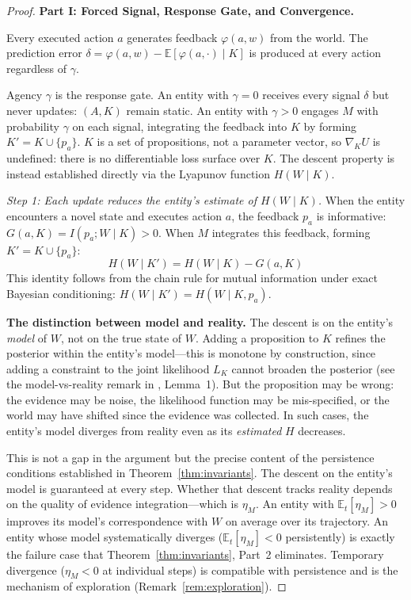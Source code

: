 \documentclass[11pt]{article}
\theoremstyle{definition}
\theoremstyle{remark}
\begin{document}
\begin{proof}
\textbf{Part I: Forced Signal, Response Gate, and Convergence.}

Every executed action $a$ generates feedback $\varphi(a, w)$ from the
world. The prediction error $\delta = \varphi(a, w) -
\mathbb{E}[\varphi(a, \cdot) \mid K]$ is produced at every action
regardless of $\gamma$.

Agency $\gamma$ is the response gate. An entity with $\gamma = 0$ receives
every signal $\delta$ but never updates: $(A, K)$ remain static. An
entity with $\gamma > 0$ engages $M$ with probability $\gamma$ on each
signal, integrating the feedback into $K$ by forming
$K' = K \cup \{p_a\}$. $K$ is a set of propositions, not a parameter
vector, so $\nabla_K U$ is undefined: there is no differentiable loss
surface over $K$. The descent property is instead established directly
via the Lyapunov function $H(W \mid K)$.

\emph{Step 1: Each update reduces the entity's estimate of $H(W \mid K)$.}
When the entity encounters a novel state and executes action $a$, the
feedback $p_a$ is informative: $G(a, K) = I(p_a; W \mid K) > 0$.
When $M$ integrates this feedback, forming $K' = K \cup \{p_a\}$:
\[
H(W \mid K') = H(W \mid K) - G(a, K)
\]
This identity follows from the chain rule for mutual information under
exact Bayesian conditioning: $H(W \mid K') = H(W \mid K, p_a)$.

\textbf{The distinction between model and reality.}
The descent is on the entity's \emph{model} of $W$, not on the true
state of $W$. Adding a proposition to $K$ refines the posterior within
the entity's model---this is monotone by construction, since adding a
constraint to the joint likelihood $L_K$ cannot broaden the posterior
(see the model-vs-reality remark in \cite{McCarthy2026b}, Lemma~1).
But the proposition may be wrong: the evidence may be noise, the
likelihood function may be mis-specified, or the world may have shifted
since the evidence was collected. In such cases, the entity's model
diverges from reality even as its \emph{estimated} $H$ decreases.

This is not a gap in the argument but the precise content of the
persistence conditions established in Theorem~\ref{thm:invariants}.
The descent on the entity's model is guaranteed at every step. Whether
that descent tracks reality depends on the quality of evidence
integration---which is $\eta_M$. An entity with
$\mathbb{E}_t[\eta_M] > 0$ improves its model's correspondence with
$W$ on average over its trajectory. An entity whose model
systematically diverges ($\mathbb{E}_t[\eta_M] < 0$ persistently) is
exactly the failure case that Theorem~\ref{thm:invariants}, Part~2
eliminates. Temporary divergence ($\eta_M < 0$ at individual steps)
is compatible with persistence and is the mechanism of exploration
(Remark~\ref{rem:exploration}).


\end{proof}
\end{document}
